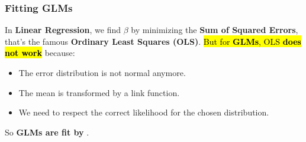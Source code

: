 \subsubsection{Fitting GLMs}\label{subsubsection: Fitting GLMs}

In \textbf{Linear Regression}, we find $\beta$ by minimizing the \textbf{Sum of Squared Errors}, that's the famous \textbf{Ordinary Least Squares (OLS)}. \hl{But for \textbf{GLMs}, OLS \textbf{does not work}} because:
\begin{itemize}
    \item The error distribution is not normal anymore.
    \item The mean is transformed by a link function.
    \item We need to respect the correct likelihood for the chosen distribution.
\end{itemize}
So \textbf{GLMs are fit by} .

